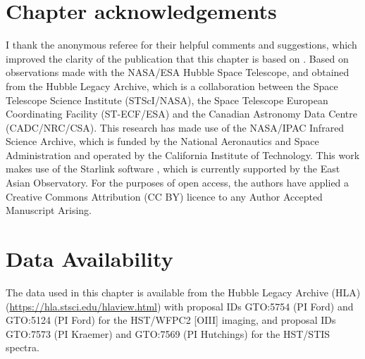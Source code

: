 \section*{Chapter acknowledgements}

I thank the anonymous referee for their helpful comments and suggestions, which improved the clarity of the publication that this chapter is based on \citep{HoldenTadhunter2023}. Based on observations made with the NASA/ESA Hubble Space Telescope, and obtained from the Hubble Legacy Archive, which is a collaboration between the Space Telescope Science Institute (STScI/NASA), the Space Telescope European Coordinating Facility (ST-ECF/ESA) and the Canadian Astronomy Data Centre (CADC/NRC/CSA). This research has made use of the NASA/IPAC Infrared Science Archive, which is funded by the National Aeronautics and Space Administration and operated by the California Institute of Technology. This work makes use of the Starlink software \citep{Currie2014}, which is currently supported by the East Asian Observatory. For the purposes of open access, the authors have applied a Creative Commons Attribution (CC BY) licence to any Author Accepted Manuscript Arising.


\section*{Data Availability}

The data used in this chapter is available from the Hubble Legacy Archive (HLA) (\url{https://hla.stsci.edu/hlaview.html}) with proposal IDs GTO:5754 (PI Ford) and GTO:5124 (PI Ford) for the HST/WFPC2 [OIII] imaging, and proposal IDs GTO:7573 (PI Kraemer) and GTO:7569 (PI Hutchings) for the HST/STIS spectra.

